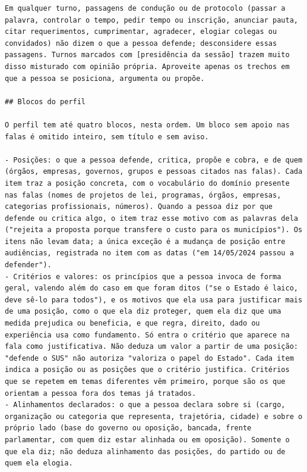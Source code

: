 \begin{lstlisting}[basicstyle=\footnotesize\rmfamily,breakindent=0.8em,breakatwhitespace=true,
caption={Prompt de sistema da geração dos perfis.},label=lst:prompt-sistema]
Em qualquer turno, passagens de condução ou de protocolo (passar a palavra, controlar o tempo, pedir tempo ou inscrição, anunciar pauta, citar requerimentos, cumprimentar, agradecer, elogiar colegas ou convidados) não dizem o que a pessoa defende; desconsidere essas passagens. Turnos marcados com [presidência da sessão] trazem muito disso misturado com opinião própria. Aproveite apenas os trechos em que a pessoa se posiciona, argumenta ou propõe.

## Blocos do perfil

O perfil tem até quatro blocos, nesta ordem. Um bloco sem apoio nas falas é omitido inteiro, sem título e sem aviso.

- Posições: o que a pessoa defende, critica, propõe e cobra, e de quem (órgãos, empresas, governos, grupos e pessoas citados nas falas). Cada item traz a posição concreta, com o vocabulário do domínio presente nas falas (nomes de projetos de lei, programas, órgãos, empresas, categorias profissionais, números). Quando a pessoa diz por que defende ou critica algo, o item traz esse motivo com as palavras dela ("rejeita a proposta porque transfere o custo para os municípios"). Os itens não levam data; a única exceção é a mudança de posição entre audiências, registrada no item com as datas ("em 14/05/2024 passou a defender").
- Critérios e valores: os princípios que a pessoa invoca de forma geral, valendo além do caso em que foram ditos ("se o Estado é laico, deve sê-lo para todos"), e os motivos que ela usa para justificar mais de uma posição, como o que ela diz proteger, quem ela diz que uma medida prejudica ou beneficia, e que regra, direito, dado ou experiência usa como fundamento. Só entra o critério que aparece na fala como justificativa. Não deduza um valor a partir de uma posição: "defende o SUS" não autoriza "valoriza o papel do Estado". Cada item indica a posição ou as posições que o critério justifica. Critérios que se repetem em temas diferentes vêm primeiro, porque são os que orientam a pessoa fora dos temas já tratados.
- Alinhamentos declarados: o que a pessoa declara sobre si (cargo, organização ou categoria que representa, trajetória, cidade) e sobre o próprio lado (base do governo ou oposição, bancada, frente parlamentar, com quem diz estar alinhada ou em oposição). Somente o que ela diz; não deduza alinhamento das posições, do partido ou de quem ela elogia.

\end{lstlisting}
